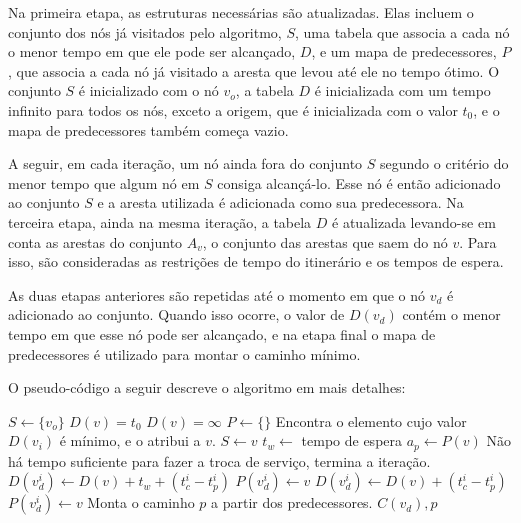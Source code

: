 Na primeira etapa, as estruturas necessárias são atualizadas. Elas incluem o conjunto dos nós já visitados pelo algoritmo, $S$, uma tabela que associa a cada nó o menor tempo em que ele pode ser alcançado, $D$, e um mapa de predecessores, $P$, que associa a cada nó já visitado a aresta que levou até ele no tempo ótimo. O conjunto $S$ é inicializado com o nó $v_o$, a tabela $D$ é inicializada com um tempo infinito para todos os nós, exceto a origem, que é inicializada com o valor $t_0$, e o mapa de predecessores também começa vazio.

A seguir, em cada iteração, um nó ainda fora do conjunto $S$ segundo o critério do menor tempo que algum nó em $S$ consiga alcançá-lo. Esse nó é então adicionado ao conjunto $S$ e a aresta utilizada é adicionada como sua predecessora. Na terceira etapa, ainda na mesma iteração, a tabela $D$ é atualizada levando-se em conta as arestas do conjunto $A_v$, o conjunto das arestas que saem do nó $v$. Para isso, são consideradas as restrições de tempo do itinerário e os tempos de espera.

As duas etapas anteriores são repetidas até o momento em que o nó $v_d$ é adicionado ao conjunto. Quando isso ocorre, o valor de $D(v_d)$ contém o menor tempo em que esse nó pode ser alcançado, e na etapa final o mapa de predecessores é utilizado para montar o caminho mínimo.

O pseudo-código a seguir descreve o algoritmo em mais detalhes:

\begin{algorithmic}
\STATE $S \gets \{v_o\}$
		\STATE $D(v) = t_0$
	\ELSE
		\STATE $D(v) = \infty$
	\ENDIF
\ENDFOR
\STATE $P \gets \{\}$
		\STATE Encontra o elemento cujo valor $D(v_i)$ é mínimo, e o atribui a $v$.
	\ENDFOR
	\STATE $S \gets v$
			\STATE $t_w \gets$ tempo de espera			
			\STATE $a_p \gets P(v)$
					\STATE Não há tempo suficiente para fazer a troca de serviço, termina a iteração.
				\ENDIF
			\ENDIF
			 	\STATE $D(v_d^i) \gets D(v)+t_w+(t_c^i - t_p^i)$
			 	\STATE $P(v_d^i) \gets v$
			 \ENDIF
		\ELSE
				\STATE $D(v_d^i) \gets D(v)+(t_c^i - t_p^i)$
				\STATE $P(v_d^i) \gets v$
			\ENDIF
		\ENDIF
	\ENDFOR
\ENDWHILE
\STATE Monta o caminho $p$ a partir dos predecessores.
\RETURN $C(v_d), p$
\end{algorithmic}

